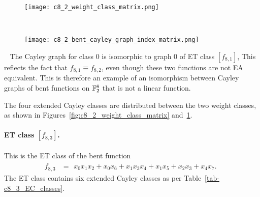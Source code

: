 \begin{figure}[!ht] %
\centering
\begin{minipage}{.48\textwidth}
  \centering
  \texttt{[image: c8\_2\_weight\_class\_matrix.png]}
  \label{fig:c8_2_weight_class_matrix}
\end{minipage}%
~~~~
\begin{minipage}{.48\textwidth}
  \centering
  \texttt{[image: c8\_2\_bent\_cayley\_graph\_index\_matrix.png]}
  \label{fig:c8_2_bent_cayley_graph_index_matrix}
\end{minipage}
\end{figure}
~
\newpage
The Cayley graph for class 0 is isomorphic to graph 0 of ET class $[f_{8,1}]$,
This reflects the fact that $f_{8,1} \equiv f_{8,2}$, even though these two functions are not
EA equivalent.
This is therefore an example of an isomorphism between Cayley graphs of bent functions on
$\mathbb{F}_2^8$ that is not a linear function.

The four extended Cayley classes are distributed between the two weight classes,
as shown in Figures~\ref{fig:c8_2_weight_class_matrix} and~\ref{fig:c8_2_bent_cayley_graph_index_matrix}.

%
\paragraph*{ET class $[f_{8,3}]$.}
%
This is the ET class of the bent function
\small{}
\begin{align*}
f_{ 8 , 3 } &=
\begin{array}{l}
x_{0} x_{1} x_{2} + x_{0} x_{6} + x_{1} x_{3} x_{4} + x_{1} x_{5} + x_{2} x_{3} + x_{4} x_{7}.
\end{array}
\end{align*}
\normalsize{}
The ET class contains six extended Cayley classes as per Table~\ref{tab-c8_3_EC_classes}.

